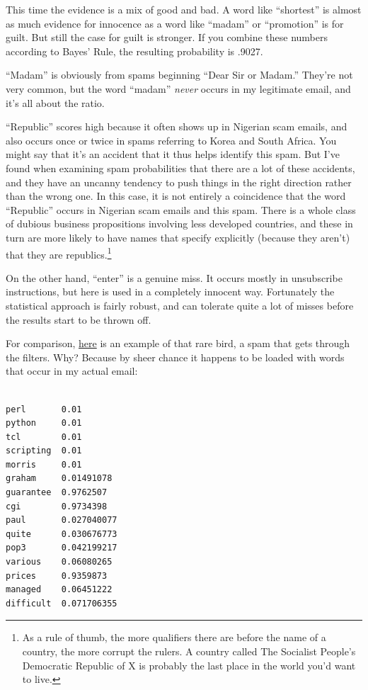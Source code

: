 This time the evidence is a mix of good and bad. A word like
``shortest'' is almost as much evidence for innocence as a word like
``madam'' or ``promotion'' is for guilt. But still the case for guilt is
stronger. If you combine these numbers according to Bayes' Rule, the
resulting probability is .9027.

``Madam'' is obviously from spams beginning ``Dear Sir or Madam.''
They're not very common, but the word ``madam'' \emph{never} occurs in
my legitimate email, and it's all about the ratio.

``Republic'' scores high because it often shows up in Nigerian scam
emails, and also occurs once or twice in spams referring to Korea and
South Africa. You might say that it's an accident that it thus helps
identify this spam. But I've found when examining spam probabilities
that there are a lot of these accidents, and they have an uncanny
tendency to push things in the right direction rather than the wrong
one. In this case, it is not entirely a coincidence that the word
``Republic'' occurs in Nigerian scam emails and this spam. There is a
whole class of dubious business propositions involving less developed
countries, and these in turn are more likely to have names that specify
explicitly (because they aren't) that they are republics.\footnote{As a rule of thumb, the more qualifiers there are before the
name of a country, the more corrupt the rulers. A country called The
Socialist People's Democratic Republic of X is probably the last place
in the world you'd want to live.}

On the other hand, ``enter'' is a genuine miss. It occurs mostly in
unsubscribe instructions, but here is used in a completely innocent way.
Fortunately the statistical approach is fairly robust, and can tolerate
quite a lot of misses before the results start to be thrown off.

For comparison,
\href{https://sep.turbifycdn.com/ty/cdn/paulgraham/hostexspam.txt?t=1688221954&}{here}
is an example of that rare bird, a spam that gets through the filters.
Why? Because by sheer chance it happens to be loaded with words that
occur in my actual email:

\begin{verbatim}

perl       0.01
python     0.01
tcl        0.01
scripting  0.01
morris     0.01
graham     0.01491078
guarantee  0.9762507
cgi        0.9734398
paul       0.027040077
quite      0.030676773
pop3       0.042199217
various    0.06080265
prices     0.9359873
managed    0.06451222
difficult  0.071706355
\end{verbatim}

